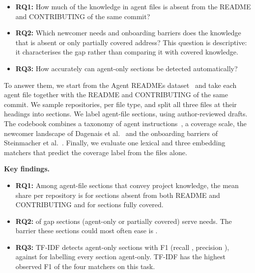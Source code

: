 \documentclass[sigconf,nonacm]{acmart}
\begin{document}
\begin{itemize}
\item \textbf{RQ1:} How much of the knowledge in agent files is absent from the README and
CONTRIBUTING of the same commit?
\item \textbf{RQ2:} Which newcomer needs and onboarding barriers does the knowledge that is absent
or only partially covered address? This question is descriptive: it characterises the gap rather
than comparing it with covered knowledge.
\item \textbf{RQ3:} How accurately can agent-only sections be detected automatically?
\end{itemize}

To answer them, we start from the Agent READMEs dataset~\cite{chatlatanagulchai2026agentreadmes}
and take each agent file together with the README and CONTRIBUTING of the same commit. We sample
\nSampleRepos{} repositories, \nPerAgent{} per file type, and split all three files at their
headings into \nUnits{} sections. We label \nQueued{} agent-file sections, using author-reviewed
drafts. The codebook combines a taxonomy of agent
instructions~\cite{chatlatanagulchai2026agentreadmes}, a coverage scale, the newcomer landscape of
Dagenais et al.~\cite{dagenais2010landscape} and the onboarding barriers of Steinmacher et
al.~\cite{steinmacher2015barriers}. Finally, we evaluate one lexical and three embedding matchers
that predict the coverage label from the files alone.

\begin{tcolorbox}[colback=black!3,colframe=black!35,boxrule=0.4pt,arc=1pt,left=4pt,right=4pt,top=3pt,bottom=3pt]
\small\textbf{Key findings.}
\begin{itemize}\setlength{\itemsep}{1pt}\setlength{\topsep}{2pt}\setlength{\leftmargin}{1em}
\item \textbf{RQ1:} Among agent-file sections that convey project knowledge, the mean share per
repository is \agentOnlyOverall{} for sections absent from both README and CONTRIBUTING and
\sharedOverall{} for sections fully covered.
\item \textbf{RQ2:} \needGroupTopShare{} of gap sections (agent-only or partially covered) serve
\emph{\needGroupTop} needs. The barrier these sections could most often ease is
\emph{\barrierTopOne}.
\item \textbf{RQ3:} TF-IDF detects agent-only sections with F1 \detectorFOne{} (recall
\detectorRecall, precision \detectorPrecision), against \baselineFOne{} for labelling every section
agent-only. TF-IDF has the highest observed F1 of the four matchers on this task.
\end{itemize}
\end{tcolorbox}
\end{document}
